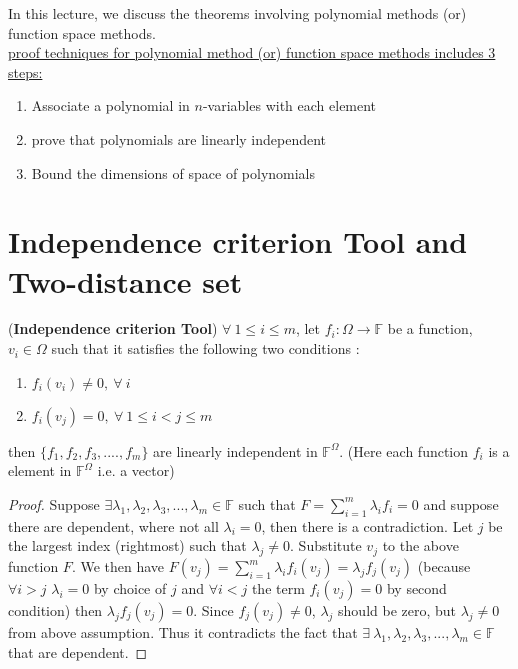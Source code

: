 In this lecture, we discuss the theorems involving polynomial methods (or) function space methods.
\\

\underline{proof techniques for polynomial method (or) function space methods includes 3 steps:}

\begin{enumerate}
     \item Associate a polynomial in $n$-variables with each element 
     \item prove that polynomials are linearly independent
     \item Bound the dimensions of space of polynomials
\end{enumerate}




\section{Independence criterion Tool and Two-distance set}

\begin{lemma}
(\textbf{Independence criterion Tool}) $\forall ~1 \le i \le m$, let $f_i : \Omega \longrightarrow \mathbb{F}$ be a function, $v_i \in \Omega$ such that it satisfies the following two conditions : 
\begin{enumerate}
    \item $f_i(v_i) \ne 0, ~\forall ~i$
    \item $f_i(v_j) = 0, ~\forall ~1 \le i<j \le m $
\end{enumerate}
then $\{f_1, f_2, f_3,....,f_m\}$ are linearly independent in $\mathbb{F}^{\Omega}$. (Here each function $f_i$ is a element in $\mathbb{F}^{\Omega}$ i.e. a vector)
\begin{proof}
Suppose $\exists \lambda_1, \lambda_2, \lambda_3,...,\lambda_m \in \mathbb{F}$ such that $F = \sum_{i =1}^{m} \lambda_i f_i = 0$ and suppose there are dependent, where not all $\lambda_i = 0$, then there is a contradiction. 
Let $j$ be the largest index (rightmost) such that $\lambda_j \ne 0.$ Substitute $v_j$ to the above function $F$.
We then have $F(v_j) = \sum_{i=1}^{m} \lambda_i f_i(v_j) = \lambda_j f_j(v_j)$ (because $\forall i > j $ $\lambda_i = 0$ by choice of $j$ and $\forall i< j$ the term $f_i(v_j) = 0$ by second condition) then $\lambda_j f_j(v_j) = 0$. Since $f_j(v_j) \ne 0$, $\lambda_j$ should be zero, but $\lambda_j \ne 0$ from above assumption. Thus it contradicts the fact that $\exists~ \lambda_1, \lambda_2, \lambda_3,...,\lambda_m \in \mathbb{F}$ that are dependent. 
\end{proof}
\end{lemma}

